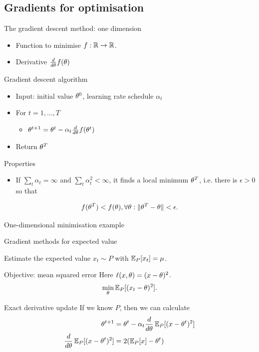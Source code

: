 \documentclass[smaller]{beamer}
\begin{document}
\subsection{Gradients for optimisation}
\label{sec:orgc17fb1b}
\begin{frame}[label={sec:orgc61a387}]{The gradient descent method: one dimension}
\begin{itemize}
\item Function to minimise \(f : \mathbb{R} \to \mathbb{R}\).
\item Derivative \(\frac{d}{d \theta} f(\theta)\)
\end{itemize}
\pause
\begin{block}{Gradient descent algorithm}
\begin{itemize}
\item Input: initial value \(\theta^0\), \alert{learning rate} schedule \(\alpha_t\)
\item For \(t=1, \ldots, T\)
\begin{itemize}
\item \(\theta^{t+1} = \theta^t - \alpha_t \frac{d}{d \theta} f(\theta^t)\)
\end{itemize}
\item Return \(\theta^T\)
\end{itemize}
\pause
\end{block}
\begin{block}{Properties}
\begin{itemize}
\item If \(\sum_t \alpha_t = \infty\) and \(\sum_t \alpha_t^2 < \infty\), it finds a local minimum \(\theta^T\), i.e. there is \(\epsilon > 0\) so that
\end{itemize}
\[
f(\theta^T) < f(\theta), \forall \theta: \|\theta^T - \theta\| < \epsilon.
\]
\end{block}
\end{frame}
\begin{frame}[label={sec:orga69e1a2}]{One-dimensional minimisation example}
\end{frame}

\begin{frame}[label={sec:org6e4af16}]{Gradient methods for expected value}
\begin{block}{Estimate the expected value}
\(x_t \sim P\) with \(\mathop{\mbox{\ensuremath{\mathbb{E}}}}\nolimits_P[x_t] = \mu\).
\pause
\end{block}
\begin{block}{Objective: mean squared error}
Here \(\ell(x, \theta) = (x - \theta)^2\).
\[
\min_\theta \mathop{\mbox{\ensuremath{\mathbb{E}}}}\nolimits_P[(x_t - \theta)^2].
\]
\pause
\end{block}
\begin{block}{Exact derivative update}
If we know \(P\), then we can calculate
\begin{align}
\theta^{t+1} &= \theta^t - \alpha_t \frac{d}{d\theta} \mathop{\mbox{\ensuremath{\mathbb{E}}}}\nolimits_P[(x - \theta^t)^2]\\
\frac{d}{d\theta} \mathop{\mbox{\ensuremath{\mathbb{E}}}}\nolimits_P[(x - \theta^t)^2] &= 2 (\mathop{\mbox{\ensuremath{\mathbb{E}}}}\nolimits_P[x] - \theta^t)
\end{align}
\end{block}
\end{frame}
\end{document}
